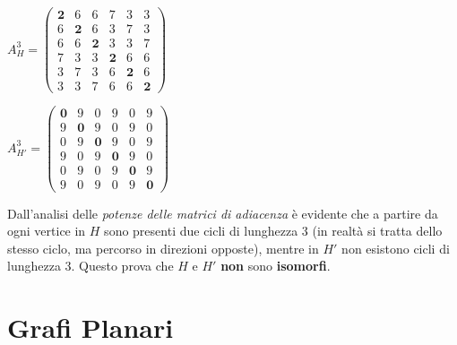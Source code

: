 \begin{flushleft}
    {\centering
        \begin{minipage}[t]{0.45\textwidth}
            \centering
            $A_H^3 = \left(\begin{array}{cccccc}
                \mathbf{2} & 6 & 6 & 7 & 3 & 3 \\
                6 & \mathbf{2} & 6 & 3 & 7 & 3 \\
                6 & 6 & \mathbf{2} & 3 & 3 & 7 \\
                7 & 3 & 3 & \mathbf{2} & 6 & 6 \\
                3 & 7 & 3 & 6 & \mathbf{2} & 6 \\
                3 & 3 & 7 & 6 & 6 & \mathbf{2}
            \end{array}\right)$
        \end{minipage}
        \begin{minipage}[t]{0.45\textwidth}
            \centering
            $A_{H'}^3 = \left(\begin{array}{cccccc}
                \mathbf{0} & 9 & 0 & 9 & 0 & 9 \\
                9 & \mathbf{0} & 9 & 0 & 9 & 0 \\
                0 & 9 & \mathbf{0} & 9 & 0 & 9 \\
                9 & 0 & 9 & \mathbf{0} & 9 & 0 \\
                0 & 9 & 0 & 9 & \mathbf{0} & 9 \\
                9 & 0 & 9 & 0 & 9 & \mathbf{0} 
            \end{array}\right)$
        \end{minipage}
    \par}
    Dall'analisi delle \textit{potenze delle matrici di adiacenza} è evidente che a partire da ogni vertice in $H$ sono presenti due cicli di lunghezza 3 (in realtà si tratta dello stesso ciclo, ma percorso in direzioni opposte), mentre in $H'$ non esistono cicli di lunghezza 3. Questo prova che $H$ e $H'$ \textbf{non} sono \textbf{isomorfi}.
\end{flushleft}

\section{Grafi Planari}

